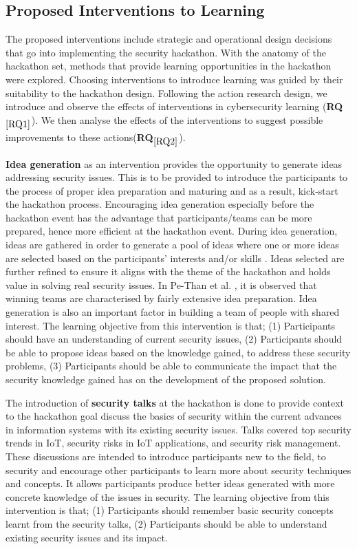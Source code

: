 \documentclass[runningheads]{llncs}
\newcommand{\hr}[1]{\textbf{RQ}$_{\ref{#1}}$}
\begin{document}
\subsection{Proposed Interventions to Learning} \label{Sec:interventions}
The proposed interventions include strategic and operational design decisions %
that go into implementing the security hackathon. With the anatomy of the hackathon set, methods that provide learning opportunities in the hackathon were explored. Choosing interventions to introduce learning was guided by their suitability to the hackathon design. Following the action research design, we introduce and observe the effects of interventions in cybersecurity learning (\hr{RQ1}). We then analyse the effects of the interventions to suggest possible improvements to these actions(\hr{RQ2}).


\textbf{Idea generation} as an intervention provides the opportunity to generate ideas addressing security issues. This is to be provided to introduce the participants to the process of proper idea preparation and maturing and as a result, kick-start the hackathon process.  Encouraging idea generation especially before the hackathon event has the advantage that participants/teams can be more prepared, hence more efficient at the hackathon event. During idea generation, ideas are gathered in order to generate a pool of ideas where one or more ideas are selected based on the participants’ interests and/or skills \cite{bohmer2015open}. Ideas selected are further refined to ensure it aligns with the theme of the hackathon and holds value in solving real security issues. In Pe-Than et al. \cite{pe2018designing}, it is observed that winning teams are characterised by fairly extensive idea preparation. Idea generation is also an important factor in building a team of people with shared interest.
The learning objective from this intervention is that; (1) Participants should have an understanding of current security issues, (2) Participants should be able to propose ideas based on the knowledge gained, to address these security problems, (3) Participants should be able to communicate the impact that the security knowledge gained has on the development of the proposed solution. 

The introduction of \textbf{security talks} at the hackathon is done to provide context to the hackathon goal discuss the basics of security within the current advances in information systems with its existing security issues. Talks covered top security trends in IoT, security risks in IoT applications, and security risk management. These discussions are intended to introduce participants new to the field, to security and encourage other participants to learn more about security techniques and concepts. It allows participants produce better ideas generated with more concrete knowledge of the issues in security. The learning objective from this intervention is that; (1) Participants should remember basic security concepts learnt from the security talks, (2) Participants should be able to understand existing security issues and its impact.
\end{document}
